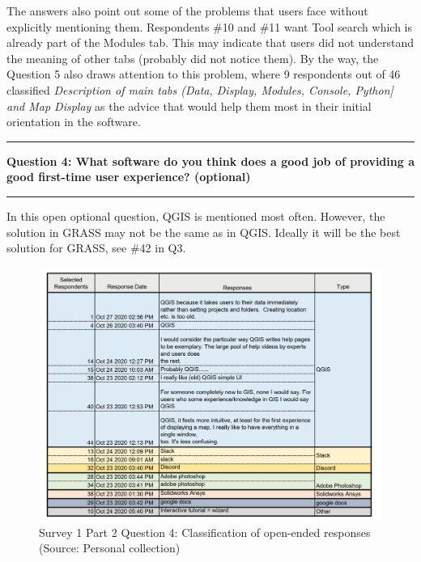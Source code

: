 \documentclass[a4paper,10pt,twoside]{article}
\begin{document}
The answers also point out some of the problems that users face without explicitly mentioning them. Respondents \#10 and \#11 want Tool search which is already part of the Modules tab. This may indicate that users did not understand the meaning of other tabs (probably did not notice them). By the way, the Question 5 also draws attention to this problem, where 9 respondents out of 46 classified \textit{Description of main tabs (Data, Display, Modules, Console, Python] and Map Display} as the advice that would help them most in their initial orientation in the software.

\par\noindent\rule{\textwidth}{0.4pt}
\noindent \textbf{Question 4: What software do you think does a good job of providing a good first-time user experience? (optional)}
\par\noindent\rule{\textwidth}{0.4pt}
\noindent In this open optional question, QGIS is mentioned most often. However, the solution in GRASS may not be the same as in QGIS. Ideally it will be the best solution for GRASS, see \#42 in Q3.

\vspace{0.3cm}
\begin{figure}[hbt!] 
\begin{center}
\includegraphics[width=16cm]{../surveys/analyzed_data/survey1_part2_question4_open_ended_1.png} 
\caption[Survey 1 Part 2 Question 4: Classification of open-ended responses]{Survey 1 Part 2 Question 4: Classification of open-ended responses (Source: Personal collection)}
\label{fig:survey1_part2_question4_open_ended_1}
\end{center}
\end{figure}
\end{document}

